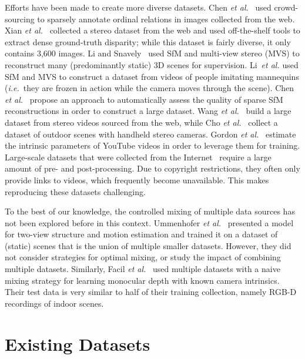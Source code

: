 Efforts have been made to create more diverse datasets. Chen \MakeLowercase{\textit{et al.}}~\cite{Chen2016} used crowd-sourcing to sparsely annotate ordinal relations in images collected from the web. Xian \MakeLowercase{\textit{et al.}}~\cite{Xian2018} collected a stereo dataset from the web and used off-the-shelf tools to extract dense ground-truth disparity; while this dataset is fairly diverse, it only contains 3,600 images. Li and Snavely~\cite{LiSnavely2018} used SfM and multi-view stereo (MVS) to reconstruct many (predominantly static) 3D scenes for supervision. Li~\MakeLowercase{\textit{et al.}} \cite{Li2019} used SfM and MVS to construct a dataset from videos of people imitating mannequins (\MakeLowercase{\textit{i.e.}}\ they are frozen in action while the camera moves through the scene). Chen \MakeLowercase{\textit{et al.}}~\cite{Chen2019} propose an approach to automatically assess the quality of sparse SfM reconstructions in order to construct a large dataset. Wang \MakeLowercase{\textit{et al.}}~\cite{Wang2019} build a large dataset from stereo videos sourced from the web, while Cho \MakeLowercase{\textit{et al.}}~\cite{Cho2019} collect a dataset of outdoor scenes with handheld stereo cameras. Gordon \MakeLowercase{\textit{et al.}}~\cite{Gordon2019} estimate the intrinsic parameters of YouTube videos in order to leverage them for training. Large-scale datasets that were collected from the Internet~\cite{Li2019,Wang2019} require a large amount of pre- and post-processing. Due to copyright restrictions, they often only provide links to videos, which frequently become unavailable. This makes reproducing these datasets challenging.

To the best of our knowledge, the controlled mixing of multiple data sources has not been explored before in this context. Ummenhofer \MakeLowercase{\textit{et al.}}~\cite{Ummenhofer2017} presented a model for two-view structure and motion estimation and trained it on a dataset of (static) scenes that is the union of multiple smaller datasets. However, they did not consider strategies for optimal mixing, or study the impact of combining multiple datasets. Similarly, Facil \MakeLowercase{\textit{et al.}}~\cite{Facil2019} used multiple datasets with a naive mixing strategy for learning monocular depth with known camera intrinsics. Their test data is very similar to half of their training collection, namely RGB-D recordings of indoor scenes. 

\section{Existing Datasets}
\label{sec:dataset}

